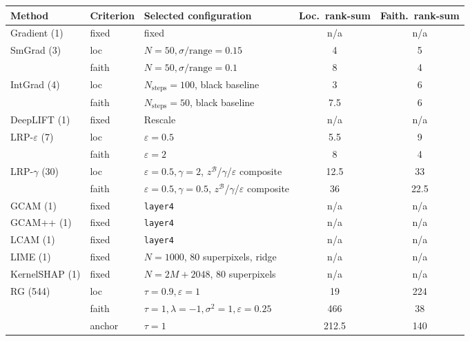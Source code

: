 \begin{tabular}{@{}l l l c c@{}}
\toprule
Method & Criterion & Selected configuration & Loc.\ rank-sum & Faith.\ rank-sum \\
\midrule
Gradient (1) & fixed & fixed & n/a & n/a \\
\addlinespace
SmGrad (3) & loc & $N{=}50,\sigma/\mathrm{range}{=}0.15$ & 4 & 5 \\
 & faith & $N{=}50,\sigma/\mathrm{range}{=}0.1$ & 8 & 4 \\
\addlinespace
IntGrad (4) & loc & $N_{\mathrm{steps}}{=}100$, black baseline & 3 & 6 \\
 & faith & $N_{\mathrm{steps}}{=}50$, black baseline & 7.5 & 6 \\
\addlinespace
DeepLIFT (1) & fixed & Rescale & n/a & n/a \\
\addlinespace
LRP-$\varepsilon$ (7) & loc & $\varepsilon{=}0.5$ & 5.5 & 9 \\
 & faith & $\varepsilon{=}2$ & 8 & 4 \\
\addlinespace
LRP-$\gamma$ (30) & loc & $\varepsilon{=}0.5,\gamma{=}2$, $z^{\mathcal{B}}$/$\gamma$/$\varepsilon$ composite & 12.5 & 33 \\
 & faith & $\varepsilon{=}0.5,\gamma{=}0.5$, $z^{\mathcal{B}}$/$\gamma$/$\varepsilon$ composite & 36 & 22.5 \\
\addlinespace
GCAM (1) & fixed & \texttt{layer4} & n/a & n/a \\
\addlinespace
GCAM++ (1) & fixed & \texttt{layer4} & n/a & n/a \\
\addlinespace
LCAM (1) & fixed & \texttt{layer4} & n/a & n/a \\
\addlinespace
LIME (1) & fixed & $N{=}1000$, 80 superpixels, ridge & n/a & n/a \\
\addlinespace
KernelSHAP (1) & fixed & $N{=}2M{+}2048$, 80 superpixels & n/a & n/a \\
\addlinespace
RG (544) & loc & $\tau{=}0.9,\varepsilon{=}1$ & 19 & 224 \\
 & faith & $\tau{=}1,\lambda{=}{-}1,\sigma^2{=}1,\varepsilon{=}0.25$ & 466 & 38 \\
 & anchor & $\tau{=}1$ & 212.5 & 140 \\
\bottomrule
\end{tabular}
